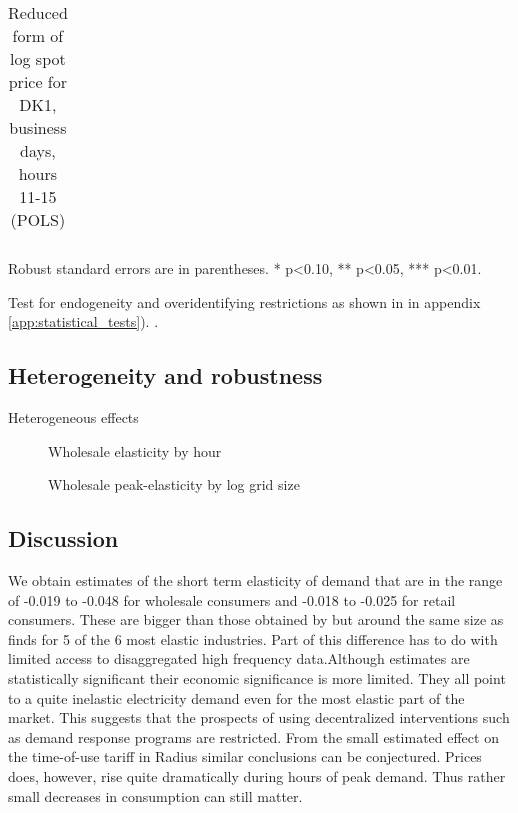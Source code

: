 \begin{table}[H]
\begin{threeparttable}
  \centering
  \caption{Reduced form of log spot price for DK1, business days, hours 11-15 (POLS)}
  \label{tab:reduced_form_price_dk1}
  \footnotesize
  \begin{tabular}{lcccc}
         
  \end{tabular}
    \begin{tablenotes}
        \item Robust standard errors are in parentheses. * p<0.10, ** p<0.05, *** p<0.01.
    \end{tablenotes}
\end{threeparttable}
\end{table}

Test for endogeneity and overidentifying restrictions as shown in in appendix \ref{app:statistical_tests}). \citep{statacorp2017stata}.
\bigskip\\


\subsection{Heterogeneity and robustness}
\label{subsec:r_robustness}


Heterogeneous effects
\begin{figure}[H]
  \centering
  \caption{Wholesale elasticity by hour}
  \label{fig:ws_elasticity_hour}
\end{figure}

\begin{figure}[H]
  \centering
  \caption{Wholesale peak-elasticity by log grid size}
  \label{fig:ws_elasticity_grid}
\end{figure}


\subsection{Discussion}
\label{subsec:r_discussion}
We obtain estimates of the short term elasticity of demand that are in the range of -0.019 to -0.048 for wholesale consumers and -0.018 to -0.025 for retail consumers. These are bigger than those obtained by \citet{lijesen2007real} but around the same size as \citet{wolak2001impact} finds for 5 of the 6 most elastic industries. Part of this difference has to do with limited access to disaggregated high frequency data.Although estimates are statistically significant their economic significance is more limited. They all point to a quite inelastic electricity demand even for the most elastic part of the market. This suggests that the prospects of using decentralized interventions such as demand response programs are restricted. From the small estimated effect on the time-of-use tariff in Radius similar conclusions can be conjectured. Prices does, however, rise quite dramatically during hours of peak demand. Thus rather small decreases in consumption can still matter. %
\bigskip

